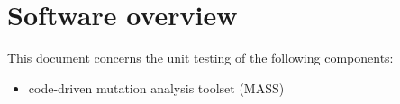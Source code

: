 
\chapter{Software overview}


This document concerns the unit testing of the following components:
\begin{itemize}
	\item code-driven mutation analysis toolset (MASS)
\end{itemize}



